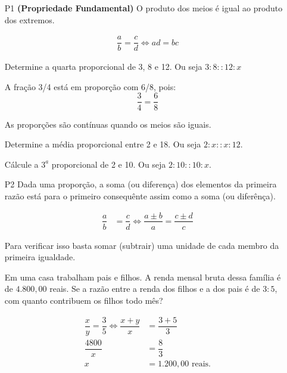\begin{enumerate}
\item[P1] \textbf{(Propriedade Fundamental)} O produto dos meios é igual ao produto dos extremos.

\begin{align}
    \dfrac{a}{b}=\dfrac{c}{d}\Leftrightarrow ad=bc
\end{align}

\begin{exe}
Determine a quarta proporcional de 3, 8 e 12. Ou seja $3:8::12:x$
\end{exe}

\begin{exe}
A fração 3/4 está em proporção com 6/8, pois: $$\dfrac{3}{4}=\dfrac{6}{8}$$
\end{exe}

\begin{defi}
As proporções são contínuas quando os meios são iguais.
\end{defi}

\begin{exe}
Determine a média proporcional entre 2 e 18. Ou seja $2:x::x:12$.
\end{exe}

\begin{exe}
Cálcule a $3^a$ proporcional de 2 e 10. Ou seja $2:10::10:x$.
\end{exe}

\item[P2] Dada uma proporção, a soma (ou diferença) dos elementos da primeira razão está para o primeiro consequênte assim como a soma (ou diferênça).

\begin{align}
    \dfrac{a}{b}&=\dfrac{c}{d} \Leftrightarrow \dfrac{a\pm b}{a}=\dfrac{c\pm d}{c}
\end{align}

Para verificar isso basta somar (subtrair) uma unidade de cada membro da primeira igualdade.

\begin{exe}
Em uma casa trabalham pais e filhos. A renda mensal bruta dessa família é de $4.800,00$ reais. Se a razão entre a renda dos filhos e a dos pais é de $3:5$, com quanto contribuem os filhos todo mês?
\end{exe}

\begin{align*}
    \dfrac{x}{y}=\dfrac{3}{5} \Leftrightarrow \dfrac{x+y}{x}&=\dfrac{3+5}{3}\\
    \dfrac{4800}{x}&=\dfrac{8}{3}\\
    x&=1.200,00 \mbox{ reais.}
\end{align*}



\end{enumerate}
